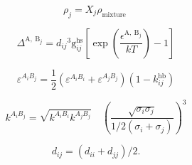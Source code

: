 \documentclass[12pt, letterpaper]{article}
\begin{document}
\begin{equation}
    \rho_{j}=X_{j} \rho_{\text {mixture }}
    \label{eq:rho_j_assoc}
\end{equation}


\begin{equation}
    \Delta^{\mathrm{A}, \mathrm{~B}_{j}}=d_{i j}{ }^3 \mathrm{g}_{i j}^{\mathrm{hs}}\left[\exp \left(\frac{\epsilon^{\mathrm{A}, \mathrm{~B}_{j}}}{k T}\right)-1\right]
    \label{eq:delta_assoc}
\end{equation}


\begin{equation}
    \varepsilon^{A_{i}B_{j}}=\frac{1}{2}(\varepsilon^{A_{i}B_{i}}+\varepsilon^{A_{j}B_{j}})(1-k_{ij}^{\mathrm{hb}})
    \label{eq:epsilon_assoc_mixing}
\end{equation}


\begin{equation}
    k^{A_{i}B_{j}}=\sqrt{k^{A_{i}B_{i}}k^{A_{j}B_{j}}}\quad\left(\frac{\sqrt{\sigma_{i}\sigma_{j}}}{1/2(\sigma_{i}+\sigma_{j})}\right)^3
    \label{eq:kappa_assoc_mixing}
\end{equation}


\begin{equation}
    d_{i j}=\left(d_{i i}+d_{j j}\right) / 2 .
    \label{eq:d_ij}
\end{equation}
\end{document}
